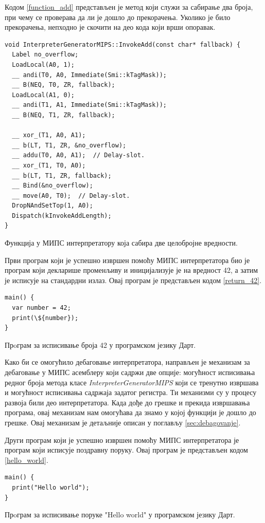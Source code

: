 \documentclass[12pt,oneside]{memoir}
\begin{document}
Кодом \ref{function_add} представљен је метод који служи за сабирање два броја, при чему се проверава да ли је дошло до прекорачења. Уколико је било прекорачења, непходно је скочити на део кода који врши опоравак.\\

\begin{listing}
\begin{verbatim}
void InterpreterGeneratorMIPS::InvokeAdd(const char* fallback) {
  Label no_overflow;
  LoadLocal(A0, 1);
  __ andi(T0, A0, Immediate(Smi::kTagMask));
  __ B(NEQ, T0, ZR, fallback);
  LoadLocal(A1, 0);
  __ andi(T1, A1, Immediate(Smi::kTagMask));
  __ B(NEQ, T1, ZR, fallback);

  __ xor_(T1, A0, A1);
  __ b(LT, T1, ZR, &no_overflow);
  __ addu(T0, A0, A1);  // Delay-slot.
  __ xor_(T1, T0, A0);
  __ b(LT, T1, ZR, fallback);
  __ Bind(&no_overflow);
  __ move(A0, T0);  // Delay-slot.
  DropNAndSetTop(1, A0);
  Dispatch(kInvokeAddLength);
}
\end{verbatim}
\caption{Функција у МИПС интерпретатору која сабира две целобројне вредности.}
\label{function_add}
\end{listing}

Први програм који је успешно извршен помоћу МИПС интерпретатора био је програм који декларише променљиву и иницијализује је на вредност 42, а затим је исписује на стандардни излаз. Овај програм је представљен кодом \ref{return_42}.\\

\begin{listing}
\begin{verbatim}
main() {
  var number = 42;
  print(\${number});
}
\end{verbatim}
\caption{Прoграм за исписивање броја 42 у програмском језику Дарт.}
\label{return_42}
\end{listing}

Како би се омогућило дебаговање интерпретатора, направљен је механизам за дебаговање у МИПС асемблеру који садржи две опције: могућност исписивања редног броја метода класе \textit{InterpreterGeneratorMIPS} који се тренутно извршава и могућност исписивања садржаја задатог регистра. Ти механизми су у процесу развоја били део интерпретатора. Када дође до грешке и прекида извршавања програма, овај механизам нам омогућава да знамо у којој функцији је дошло до грешке. Овај механизам је детаљније описан у поглављу \ref{sec:debagovanje}.

Други програм који је успешно извршен помоћу МИПС интерпретатора је програм који исписује поздравну поруку. Овај програм је представљен кодом \ref{hello_world}.\\
\begin{listing}
\begin{verbatim}
main() {
  print("Hello world");
}
\end{verbatim}
\caption{Прoграм за исписивање поруке "Hello world" у програмском језику Дарт.}
\label{hello_world}
\end{listing}
\end{document}
